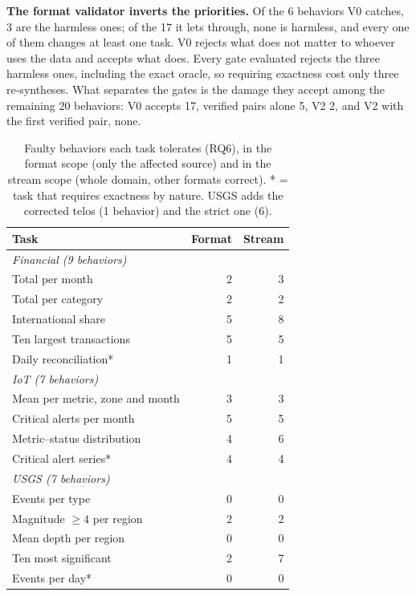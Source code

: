 \documentclass[sigconf,nonacm]{acmart}
\begin{document}
\textbf{The format validator inverts the priorities.} Of the 6 behaviors V0 catches, 3 are the harmless ones; of the 17 it lets through, none is harmless, and every one of them changes at least one task. V0 rejects what does not matter to whoever uses the data and accepts what does. Every gate evaluated rejects the three harmless ones, including the exact oracle, so requiring exactness cost only three re-syntheses. What separates the gates is the damage they accept among the remaining 20 behaviors: V0 accepts 17, verified pairs alone 5, V2 2, and V2 with the first verified pair, none.

\begin{table}[t]
\caption{Faulty behaviors each task tolerates (RQ6), in the format scope (only the affected source) and in the stream scope (whole domain, other formats correct). * = task that requires exactness by nature. USGS adds the corrected telos (1 behavior) and the strict one (6).}
\label{tab:rq6}
\small
\begin{tabular}{lrr}
\toprule
Task & Format & Stream \\
\midrule
\multicolumn{3}{l}{\textit{Financial (9 behaviors)}} \\
Total per month & 2 & 3 \\
Total per category & 2 & 2 \\
International share & 5 & 8 \\
Ten largest transactions & 5 & 5 \\
Daily reconciliation* & 1 & 1 \\
\midrule
\multicolumn{3}{l}{\textit{IoT (7 behaviors)}} \\
Mean per metric, zone and month & 3 & 3 \\
Critical alerts per month & 5 & 5 \\
Metric--status distribution & 4 & 6 \\
Critical alert series* & 4 & 4 \\
\midrule
\multicolumn{3}{l}{\textit{USGS (7 behaviors)}} \\
Events per type & 0 & 0 \\
Magnitude $\geq 4$ per region & 2 & 2 \\
Mean depth per region & 0 & 0 \\
Ten most significant & 2 & 7 \\
Events per day* & 0 & 0 \\
\bottomrule
\end{tabular}
\end{table}
\end{document}
